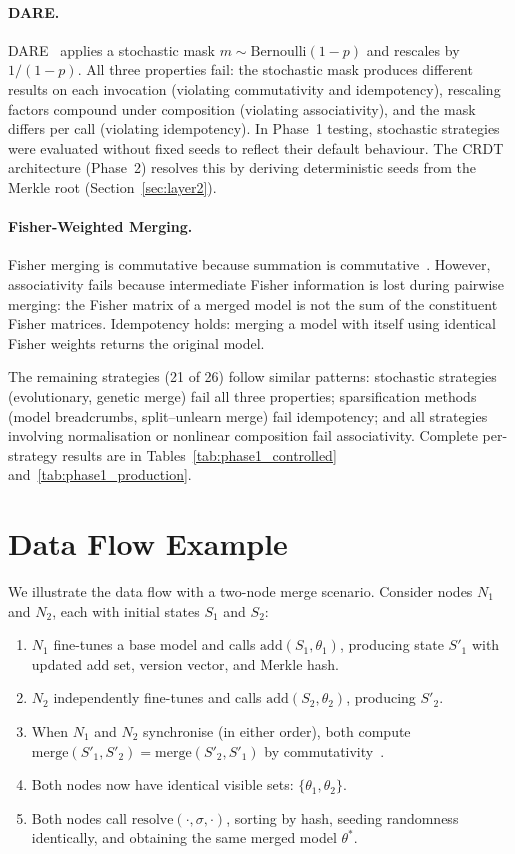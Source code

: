 \documentclass[10pt,letterpaper]{article}
\begin{document}
\paragraph{DARE.}
DARE~\cite{yu2024dare} applies a stochastic mask $m \sim \mathrm{Bernoulli}(1-p)$ and rescales by $1/(1-p)$.
All three properties fail: the stochastic mask produces different results on each invocation (violating commutativity and idempotency), rescaling factors compound under composition (violating associativity), and the mask differs per call (violating idempotency).
In Phase~1 testing, stochastic strategies were evaluated without fixed seeds to reflect their default behaviour.
The CRDT architecture (Phase~2) resolves this by deriving deterministic seeds from the Merkle root (Section~\ref{sec:layer2}).

\paragraph{Fisher-Weighted Merging.}
Fisher merging is commutative because summation is commutative~\cite{matena2022merging}.
However, associativity fails because intermediate Fisher information is lost during pairwise merging: the Fisher matrix of a merged model is not the sum of the constituent Fisher matrices.
Idempotency holds: merging a model with itself using identical Fisher weights returns the original model.

The remaining strategies (21 of 26) follow similar patterns: stochastic strategies (evolutionary, genetic merge) fail all three properties; sparsification methods (model breadcrumbs, split--unlearn merge) fail idempotency; and all strategies involving normalisation or nonlinear composition fail associativity.
Complete per-strategy results are in Tables~\ref{tab:phase1_controlled} and~\ref{tab:phase1_production}.
\endgroup


\section{Data Flow Example}\label{app:data_flow}

We illustrate the data flow with a two-node merge scenario.
Consider nodes $N_1$ and $N_2$, each with initial states $S_1$ and $S_2$:

\begin{enumerate}
\item $N_1$ fine-tunes a base model and calls $\mathrm{add}(S_1, \theta_1)$, producing state $S'_1$ with updated add set, version vector, and Merkle hash.
\item $N_2$ independently fine-tunes and calls $\mathrm{add}(S_2, \theta_2)$, producing $S'_2$.
\item When $N_1$ and $N_2$ synchronise (in either order), both compute $\mathrm{merge}(S'_1, S'_2) = \mathrm{merge}(S'_2, S'_1)$ by commutativity~\cite{shapiro2011conflict}.
\item Both nodes now have identical visible sets: $\{\theta_1, \theta_2\}$.
\item Both nodes call $\mathrm{resolve}(\cdot, \sigma, \cdot)$, sorting by hash, seeding randomness identically, and obtaining the same merged model $\theta^*$.
\end{enumerate}
\end{document}
